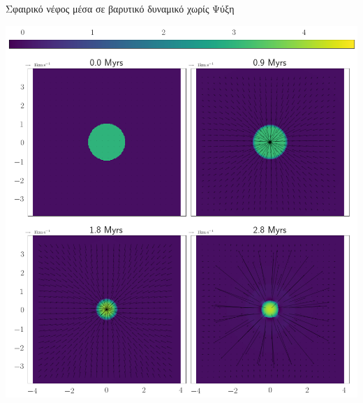 \documentclass{beamer}
\begin{document}
\begin{frame}{Σφαιρικό νέφος μέσα σε βαρυτικό δυναμικό χωρίς Ψύξη}
\begin{center}
	\includegraphics[width=0.6\linewidth]{../Document/DataImages/NoCoolGRquad}
\end{center}
\end{frame}
\end{document}
